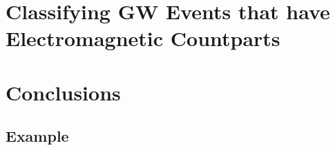 \documentclass[12pt]{article}
\begin{document}




\section{Classifying GW Events that have Electromagnetic Countparts}
\label{sec:classifier}



\section{Conclusions}
\label{sec:conclusions}



\printbibliography[heading=subbibliography]

\begin{appendices}

\section{Example}
\label{app:example}


\end{appendices}
\end{document}
